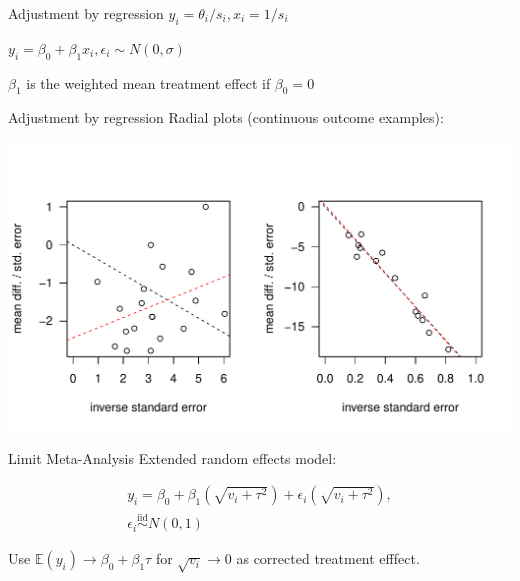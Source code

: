 \documentclass[english]{beamer}\usepackage[]{graphicx}\usepackage[]{color}
\makeatletter
\def\maxwidth{ %
  \ifdim\Gin@nat@width>\linewidth
    \linewidth
  \else
    \Gin@nat@width
  \fi
}
\newenvironment{knitrout}{}{} %
\makeatother
\begin{document}
\begin{frame}{Adjustment by regression}
$y_i = \theta_i/s_i, x_i = 1/s_i$

$y_i = \beta_0 + \beta_1 x_i, \epsilon_i \sim N(0, \sigma)$

$\beta_{1}$ is the weighted mean treatment effect if $\beta_{0} = 0$
\end{frame}


\begin{frame}{Adjustment by regression}
Radial plots (continuous outcome examples):

\vspace{-1.1cm}

\begin{knitrout}
\color{fgcolor}
\includegraphics[width=\maxwidth]{figure/unnamed-chunk-8-1} 

\end{knitrout}
\end{frame}



\begin{frame}[fragile]{Limit Meta-Analysis}
Extended random effects model:

\vspace{-4mm}
\begin{align}
y_{i} = \beta_{0} + \beta_{1}(\sqrt{v_{i} + \tau^2}) + \epsilon_{i}(\sqrt{v_{i} + \tau^2}), \nonumber \\
\epsilon_{i} \stackrel{\textrm{iid}}{\sim} N(0,1) \nonumber
\end{align}

Use $\mathbb{E}(y_{i}) \rightarrow \beta_{0} + \beta_{1}\tau$ for $\sqrt{v_{i}} \rightarrow 0$
as corrected treatment efffect.
\end{frame}
\end{document}

